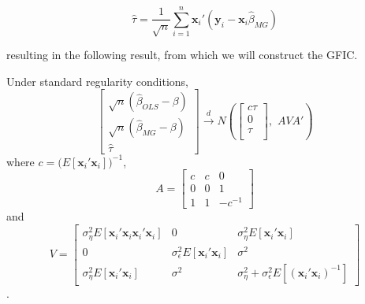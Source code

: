\begin{equation}
\widehat{\tau} = \frac{1}{\sqrt{n}} \sum_{i=1}^n \mathbf{x}_i' (\mathbf{y}_i - \mathbf{x}_i \widehat{\beta}_{MG})
\end{equation}

resulting in the following result, from which we will construct the GFIC. 

\begin{thm}
\label{thm:OLSvsMG}
  Under standard regularity conditions,
\[
  \left[\begin{array}{c}
\sqrt{n} (\widehat{\beta}_{OLS} - \beta)\\
\sqrt{n} (\widehat{\beta}_{MG} - \beta)\\
\widehat{\tau}
\end{array}\right] \overset{d}{\rightarrow} N \left( 
\left[\begin{array}{c}
c\tau \\
0  \\
\tau\\
\end{array}\right],  
\,\,A V A' \right)
\]
where $c = \big(E[\mathbf{x}_i' \mathbf{x}_i] \big)^{-1}$, 
\[
A = \left[\begin{array}{ccc}
c  & c& 0\\
0& 0 & 1\\
1 & 1 & -c^{-1}
\end{array}\right] \]
and
\[
V = \left[\begin{array}{ccc}
\sigma_\eta^2 E[\mathbf{x}_i'\mathbf{x}_i\mathbf{x}_i' \mathbf{x}_i]  & 0  & \sigma_\eta^2 E[\mathbf{x}_i' \mathbf{x}_i] \\
0 & \sigma_\epsilon^2 E[\mathbf{x}_i'\mathbf{x}_i] & \sigma^2\\ 
\sigma_\eta^2 E[\mathbf{x}_i'\mathbf{x}_i] & \sigma^2 & \sigma_\eta^2 + \sigma_\epsilon^2 E[(\mathbf{x}_i'\mathbf{x}_i)^{-1} ]
\end{array}\right] \].\\
\end{thm}


